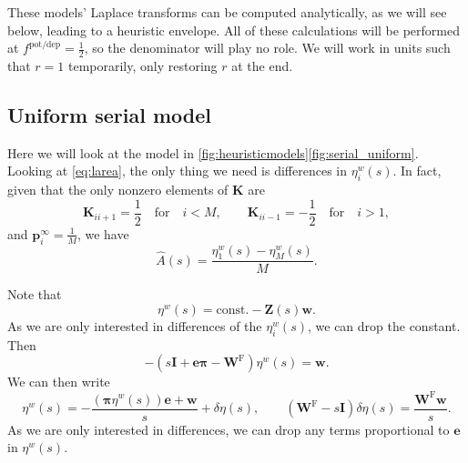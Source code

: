 \documentclass[12pt]{article}
\newcommand{\I}{\mathbf{I}}
\newcommand{\onev}{\mathbf{e}}
\newcommand{\pr}{\mathbf{p}}
\newcommand{\eq}{\pr^\infty}
\newcommand{\fund}{\mathbf{Z}}
\newcommand{\pib}{\boldsymbol{\pi}}
\newcommand{\w}{\mathbf{w}}
\newcommand{\W}{\mathbf{W}}
\newcommand{\enc}{\mathbf{K}}
\newcommand{\frg}{\W^{\mathrm{F}}}
\newcommand{\potdep}{^{\text{pot/dep}}}
\begin{document}
These models' Laplace transforms can be computed analytically, as we will see below, leading to a heuristic envelope.
All of these calculations will be performed at $f\potdep=\frac{1}{2}$, so the denominator will play no role.
We will work in units such that $r=1$ temporarily, only restoring $r$ at the end.


\subsection{Uniform serial model}\label{sec:serial_uniform}


Here we will look at the model in \autoref{fig:heuristicmodels}\ref{fig:serial_uniform}.
Looking at \eqref{eq:larea}, the only thing we need is differences in $\eta^w_i(s)$.
In fact, given that the only nonzero elements of $\enc$ are
%
\begin{equation}\label{eq:unienc}
  \enc_{ii+1}=\frac{1}{2} \quad\text{for}\quad i<M, 
  \qquad
  \enc_{ii-1}=-\frac{1}{2} \quad\text{for}\quad i>1,
\end{equation}
%
and $\eq_i = \frac{1}{M}$, we have
%
\begin{equation}\label{eq:uniareaeta}
  \hat{A}(s) = \frac{\eta^w_1(s) - \eta^w_M(s)}{M}.
\end{equation}
%

Note that
%
\begin{equation}\label{eq:etafund}
  \eta^w(s) = \text{const.} - \fund(s)\w.
\end{equation}
%
As we are only interested in differences of the $\eta^w_i(s)$, we can drop the constant.
Then
%
\begin{equation}\label{eq:etarecur}
  -(s\I + \onev\pib - \frg)\eta^w(s) = \w.
\end{equation}
%
We can then write
%
\begin{equation}\label{eq:detarecur}
  \eta^w(s) = -\frac{(\pib\eta^w(s))\onev+\w}{s} + \delta\eta(s),
  \qquad
  (\frg-s\I)\delta\eta(s) = \frac{\frg\w}{s}.
\end{equation}
%
As we are only interested in differences, we can drop any terms proportional to $\onev$ in $\eta^w(s)$.
\end{document}
